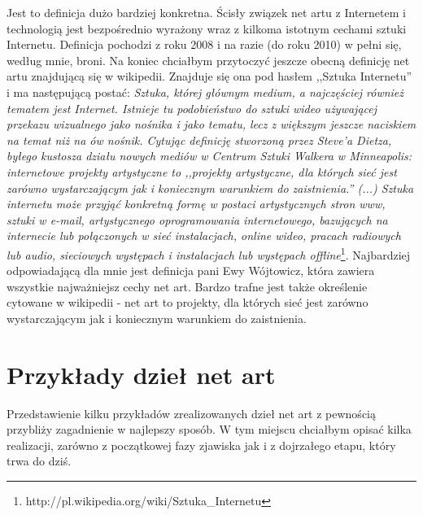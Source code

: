 \documentclass[a4paper,12pt,twoside]{article}
\begin{document}
Jest to definicja dużo bardziej konkretna. Ścisły związek net artu
z Internetem i technologią jest bezpośrednio wyrażony wraz z kilkoma
istotnym cechami sztuki Internetu. Definicja pochodzi z roku 2008
i na razie (do roku 2010) w pełni się, według mnie, broni.
Na koniec chciałbym przytoczyć jeszcze obecną definicję net artu znajdującą
się w wikipedii. Znajduje się ona pod hasłem ,,Sztuka Internetu'' i ma
następującą postać: %
\textit{Sztuka, której głównym
medium, a najczęściej również tematem jest Internet. Istnieje tu podobieństwo
do sztuki wideo używającej przekazu wizualnego jako nośnika i jako tematu,
lecz z większym jeszcze naciskiem na temat niż na ów nośnik. Cytując definicję
stworzoną przez Steve'a Dietza, byłego kustosza działu nowych mediów
w Centrum Sztuki Walkera w Minneapolis: internetowe projekty artystyczne
to ,,projekty artystyczne, dla których sieć jest zarówno wystarczającym
jak i koniecznym warunkiem do zaistnienia.'' (...) Sztuka internetu może
przyjąć konkretną formę w postaci artystycznych stron www, sztuki w e-mail,
artystycznego oprogramowania internetowego, bazujących na internecie lub
połączonych w sieć instalacjach, online wideo, pracach radiowych lub audio,
sieciowych występach i instalacjach lub występach
offline}\footnote{http://pl.wikipedia.org/wiki/Sztuka\_Internetu}.
Najbardziej odpowiadającą dla mnie jest definicja pani Ewy Wójtowicz,
która zawiera wszystkie najważniejsz cechy net art. Bardzo trafne jest
także określenie cytowane w wikipedii - net art to projekty, dla których
sieć jest zarówno wystarczającym jak i koniecznym warunkiem do zaistnienia.

\section{Przykłady dzieł net art}

Przedstawienie kilku przykładów zrealizowanych dzieł net art z pewnością
przybliży zagadnienie w najlepszy sposób. W tym miejscu chciałbym
opisać kilka realizacji, zarówno z początkowej fazy zjawiska jak
i z dojrzałego etapu, który trwa do dziś.
\end{document}
